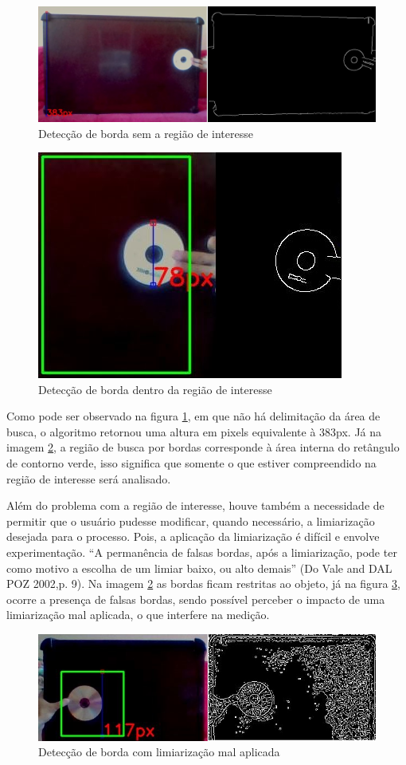 \documentclass[a4paper,alpha-refs]{RBCA_v1.0}
\begin{document}
\begin{figure}[h!]
	\centering
	\includegraphics[width=.5\textwidth]{img/05-IMAGEM3.jpg}
	\caption{Detecção de borda sem a região de interesse}
	\label{img:img3}
\end{figure}

\begin{figure}[h!]
	\centering
	\includegraphics[width=.3\textwidth]{img/06-IMAGEM4.jpg}
	\caption{Detecção de borda dentro da região de interesse}
	\label{img:img4}
\end{figure}

Como pode ser observado na figura \ref{img:img3}, em que não há delimitação da área de busca, o algoritmo retornou uma altura em pixels equivalente à 383px. Já na imagem \ref{img:img4}, a região de busca por bordas corresponde à área interna do retângulo de contorno verde, isso significa que somente o que estiver compreendido na região de interesse será analisado.

Além do problema com a região de interesse, houve também a necessidade de permitir que o usuário pudesse modificar, quando necessário, a limiarização desejada para o processo. Pois, a aplicação da limiarização é difícil e envolve experimentação. “A permanência de falsas bordas, após a limiarização, pode ter como motivo a escolha de um limiar baixo, ou alto demais” (Do Vale and DAL POZ 2002,p. 9). Na imagem \ref{img:img4} as bordas ficam restritas ao objeto, já na figura \ref{img:img5}, ocorre a presença de falsas bordas, sendo possível perceber o impacto de uma limiarização mal aplicada, o que interfere na medição.

\begin{figure}[h!]
	\centering
	\includegraphics[width=.5\textwidth]{img/07-IMAGEM5.jpg}
	\caption{Detecção de borda com limiarização mal aplicada}
	\label{img:img5}
\end{figure}
\end{document}
